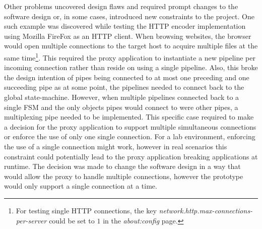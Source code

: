 Other problems uncovered design flaws and required prompt changes to the software design or, in some cases, introduced new constraints to the project. One such example was discovered while testing the \ac{HTTP} encoder implementation using Mozilla FireFox as an \ac{HTTP} client. When browsing websites, the browser would open multiple connections to the target host to acquire multiple files at the same time\footnote{For testing single \ac{HTTP} connections, the key \emph{network.http.max-connections-per-server} could be set to $1$ in the \emph{about:config} page.}. This required the proxy application to instantiate a new pipeline per incoming connection rather than reside on using a single pipeline. Also, this broke the design intention of pipes being connected to at most one preceding and one succeeding pipe as at some point, the pipelines needed to connect back to the global state-machine. However, when multiple pipelines connected back to a single \ac{FSM} and the only objects pipes would connect to were other pipes, a multiplexing pipe needed to be implemented. This specific case required to make a decision for the proxy application to support multiple simultaneous connections or enforce the use of only one single connection. For a lab environment, enforcing the use of a single connection might work, however in real scenarios this constraint could potentially lead to the proxy application breaking applications at runtime. The decision was made to change the software design in a way that would allow the proxy to handle multiple connections, however the prototype would only support a single connection at a time.
